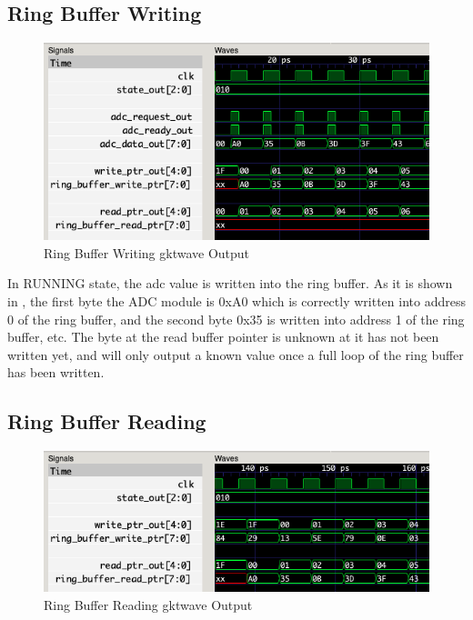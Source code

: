 \subsection{Ring Buffer Writing}\label{subsec:ring-buffer-writing}
\begin{figure}[H]
    \centering
    \includegraphics[width=\columnwidth]{Figures/Badc_ring_buffer_write}
    \caption{Ring Buffer Writing gktwave Output}
    \label{fig:testB}
\end{figure}

In RUNNING state, the adc value is written into the ring buffer.
As it is shown in , the first byte the ADC module is 0xA0 which is correctly written into address 0 of the ring buffer, and the second byte 0x35 is written into address 1 of the ring buffer, etc.
The byte at the read buffer pointer is unknown at it has not been written yet, and will only output a known value once a full loop of the ring buffer has been written.

\subsection{Ring Buffer Reading}
\begin{figure}[H]
    \centering
    \includegraphics[width=\columnwidth]{Figures/Cadc_ring_buffer_read}
    \caption{Ring Buffer Reading gktwave Output}
    \label{fig:testC}
\end{figure}

